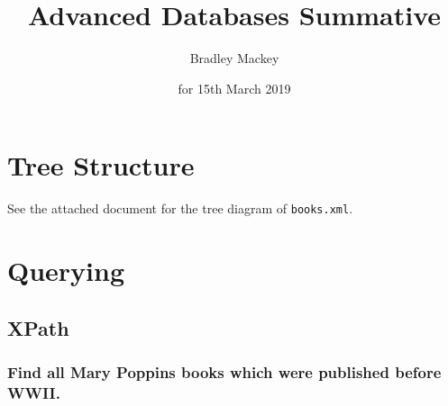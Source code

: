 \documentclass[11pt]{article}
\begin{document}
\title{\textbf{Advanced Databases Summative}}
\date{for 15th March 2019}
\author{Bradley Mackey}
\maketitle

\section{Tree Structure}

See the attached document for the tree diagram of \texttt{books.xml}.

\section{Querying}

\subsection{XPath}

\subsubsection{Find all Mary Poppins books which were published before WWII.}
\end{document}
